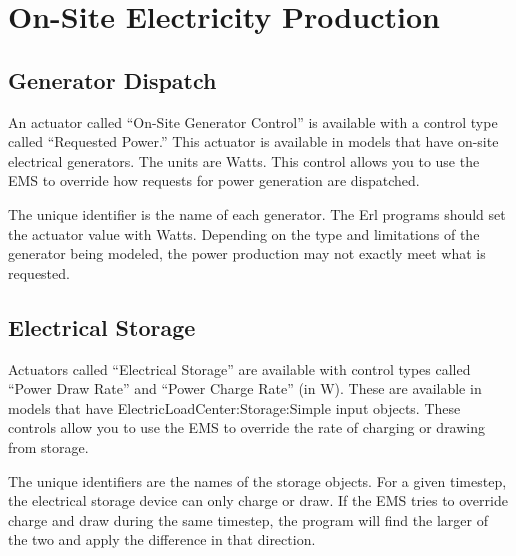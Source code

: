 \section{On-Site Electricity Production}\label{on-site-electricity-production}

\subsection{Generator Dispatch}\label{generator-dispatch}

An actuator called ``On-Site Generator Control'' is available with a control type called ``Requested Power.'' This actuator is available in models that have on-site electrical generators. The units are Watts. This control allows you to use the EMS to override how requests for power generation are dispatched.

The unique identifier is the name of each generator. The Erl programs should set the actuator value with Watts. Depending on the type and limitations of the generator being modeled, the power production may not exactly meet what is requested.

\subsection{Electrical Storage}\label{electrical-storage}

Actuators called ``Electrical Storage'' are available with control types called ``Power Draw Rate'' and ``Power Charge Rate'' (in W). These are available in models that have ElectricLoadCenter:Storage:Simple input objects. These controls allow you to use the EMS to override the rate of charging or drawing from storage.

The unique identifiers are the names of the storage objects. For a given timestep, the electrical storage device can only charge or draw. If the EMS tries to override charge and draw during the same timestep, the program will find the larger of the two and apply the difference in that direction.
